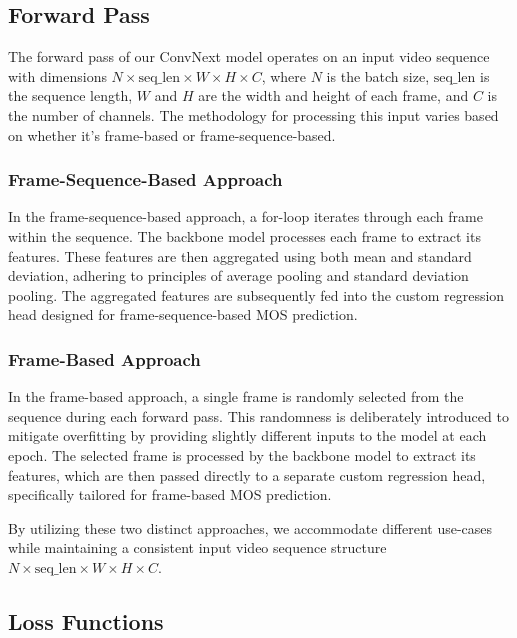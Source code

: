 \documentclass[a4paper,12pt,openright]{book}
\begin{document}
\subsection{Forward Pass}

The forward pass of our ConvNext model operates on an input video sequence with dimensions \(N \times \text{seq\_len} \times W \times H \times C\), where \(N\) is the batch size, \(\text{seq\_len}\) is the sequence length, \(W\) and \(H\) are the width and height of each frame, and \(C\) is the number of channels. The methodology for processing this input varies based on whether it's frame-based or frame-sequence-based.

\subsubsection{Frame-Sequence-Based Approach}
\label{frame:based}

In the frame-sequence-based approach, a for-loop iterates through each frame within the sequence. The backbone model processes each frame to extract its features. These features are then aggregated using both mean and standard deviation, adhering to principles of average pooling and standard deviation pooling. The aggregated features are subsequently fed into the custom regression head designed for frame-sequence-based MOS prediction.

\subsubsection{Frame-Based Approach}

In the frame-based approach, a single frame is randomly selected from the sequence during each forward pass. This randomness is deliberately introduced to mitigate overfitting by providing slightly different inputs to the model at each epoch. The selected frame is processed by the backbone model to extract its features, which are then passed directly to a separate custom regression head, specifically tailored for frame-based MOS prediction.

By utilizing these two distinct approaches, we accommodate different use-cases while maintaining a consistent input video sequence structure \(N \times \text{seq\_len} \times W \times H \times C\).

\subsection{Loss Functions}
\end{document}

